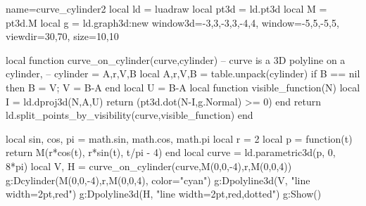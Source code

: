\documentclass{standalone}
\begin{document}
\begin{luadraw}{name=curve_cylinder2}
local ld = luadraw
local pt3d = ld.pt3d
local M = pt3d.M
local g = ld.graph3d:new{
    window3d={-3,3,-3,3,-4,4}, window={-5,5,-5,5}, 
    viewdir={30,70}, size={10,10}
}

local function curve_on_cylinder(curve,cylinder)
-- curve is a 3D polyline on a cylinder,
-- cylinder = {A,r,V,B}
    local A,r,V,B = table.unpack(cylinder)
    if B == nil then B = V; V = B-A end
    local U = B-A
    local function visible_function(N)
        local I = ld.dproj3d(N,{A,U})
        return (pt3d.dot(N-I,g.Normal) >= 0)
    end
    return ld.split_points_by_visibility(curve,visible_function)
end

local sin, cos, pi = math.sin, math.cos, math.pi
local r = 2
local p = function(t)
    return M(r*cos(t), r*sin(t), t/pi - 4)
end
local curve = ld.parametric3d(p, 0, 8*pi)
local V, H = curve_on_cylinder(curve,{M(0,0,-4),r,M(0,0,4)}) 
g:Dcylinder(M(0,0,-4),r,M(0,0,4), {color="cyan"})
g:Dpolyline3d(V, "line width=2pt,red")
g:Dpolyline3d(H, "line width=2pt,red,dotted")
g:Show()
\end{luadraw}
\end{document}
